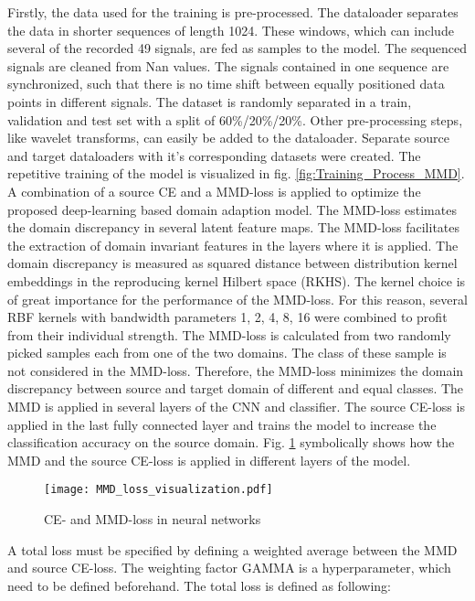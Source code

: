 Firstly, the data used for the training is pre-processed. The dataloader separates the data in shorter sequences of length 1024. These windows, which can include several of the recorded 49 signals, are fed as samples to the model. The sequenced signals are cleaned from Nan values. The signals contained in one sequence are synchronized, such that there is no time shift between equally positioned data points in different signals. The dataset is randomly separated in a train, validation and test set with a split of 60\%/20\%/20\%. Other pre-processing steps, like wavelet transforms, can easily be added to the dataloader. Separate source and target dataloaders with it's corresponding datasets were created. The repetitive training of the model is visualized in fig. \ref{fig:Training_Process_MMD}. A combination of a source CE and a MMD-loss is applied to optimize the proposed deep-learning based domain adaption model. The MMD-loss estimates the domain discrepancy in several latent feature maps. The MMD-loss facilitates the extraction of domain invariant features in the layers where it is applied. The domain discrepancy is measured as squared distance between distribution kernel embeddings in the reproducing kernel Hilbert space (RKHS). The kernel choice is of great importance for the performance of the MMD-loss. For this reason, several RBF kernels with bandwidth parameters 1, 2, 4, 8, 16 were combined to profit from their individual strength. The MMD-loss is calculated from two randomly picked samples each from one of the two domains. The class of these sample is not considered in the MMD-loss. Therefore, the MMD-loss minimizes the domain discrepancy between source and target domain of different and equal classes. The MMD is applied in several layers of the CNN and classifier. The source CE-loss is applied in the last fully connected layer and trains the model to increase the classification accuracy on the source domain. Fig. \ref{fig:MMD_Loss_and_CE_loss} symbolically shows how the MMD and the source CE-loss is applied in different layers of the model.



\begin{figure}[H]
  \centering
  \texttt{[image: MMD\_loss\_visualization.pdf]}
  \caption {CE- and MMD-loss in neural networks} \label{fig:MMD_Loss_and_CE_loss}
\end{figure}
 
A total loss must be specified by defining a weighted average between the MMD and source CE-loss. The weighting factor GAMMA is a hyperparameter, which need to be defined beforehand. The total loss is defined as following:

